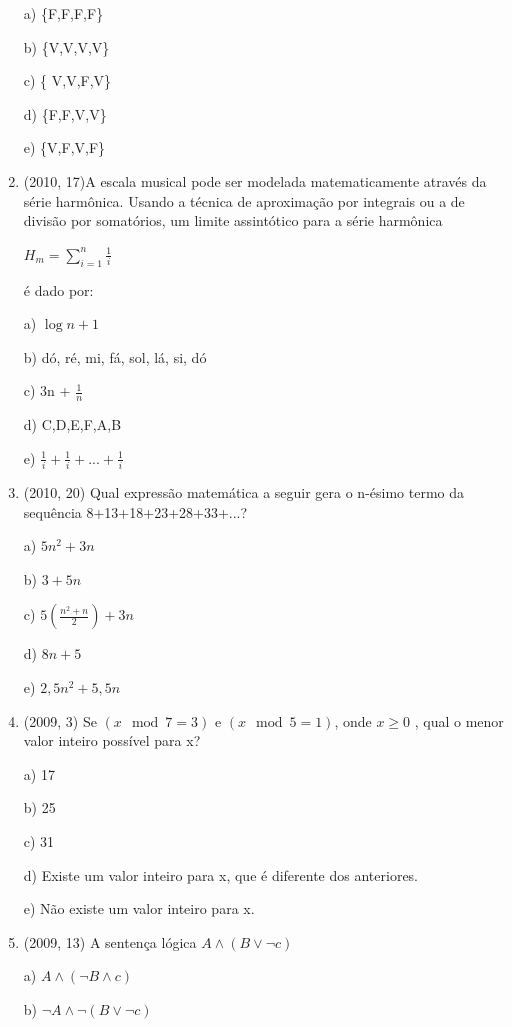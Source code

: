 \documentclass{article}
\begin{document}
\begin{enumerate}
a) \{F,F,F,F\}

b) \{V,V,V,V\}

c) \{ V,V,F,V\}

d) \{F,F,V,V\}

e) \{V,F,V,F\}\newline





\item(2010, 17)A escala musical pode ser modelada matematicamente através da série harmônica. Usando a técnica de aproximação por integrais ou a de divisão por somatórios, um limite assintótico para a série harmônica

$H_m = \sum_{i=1}^n \frac{1}{i}$

é dado por:

a) $\log n+1$

b) dó, ré, mi, fá, sol, lá, si, dó

c) 3n + $\frac{1}{n}$

d) C,D,E,F,A,B

e) $ \frac{1}{i} + \frac{1}{i}+ ... + \frac{1}{i}  $ \newline



\item(2010, 20) Qual expressão matemática a seguir gera o n-ésimo termo da sequência 8+13+18+23+28+33+...?


a) $5n^2 + 3 n$

b) $3 + 5n$

c) $5( \frac{n^2 + n}{2} ) + 3n$

d) $8n + 5$

e) $2 ,5n^2 + 5 , 5n$



\item(2009, 3) Se $(x \mod{7} = 3)$ e $(x \mod{5} = 1)$, onde $x \geq 0$ , qual o menor valor inteiro possível para x?


a) 17

b) 25

c) 31

d) Existe um valor inteiro para x, que é diferente dos anteriores.

e) Não existe um valor inteiro para x.




\item(2009, 13) A sentença lógica $A\land (B\lor \lnot c)$

a) $A\land (\lnot B \land c)$

b) $\lnot A \land \lnot (B \lor \lnot c)$


\end{enumerate}
\end{document}
